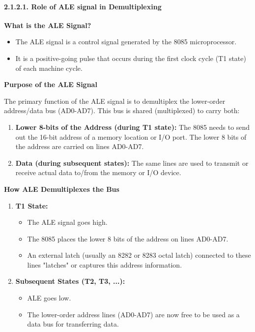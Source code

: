 \documentclass[
]{article}
\begin{document}
\hypertarget{2121-role-of-ale-signal-in-demultiplexing}{%
\paragraph{2.1.2.1. Role of ALE signal in
Demultiplexing}\label{2121-role-of-ale-signal-in-demultiplexing}}

\textbf{What is the ALE Signal?}

\begin{itemize}
\item
  The ALE signal is a control signal generated by the 8085
  microprocessor.
\item
  It is a positive-going pulse that occurs during the first clock cycle
  (T1 state) of each machine cycle.
\end{itemize}

\textbf{Purpose of the ALE Signal}

The primary function of the ALE signal is to demultiplex the lower-order
address/data bus (AD0-AD7). This bus is shared (multiplexed) to carry
both:

\begin{enumerate}
\def\labelenumi{\arabic{enumi}.}
\item
  \textbf{Lower 8-bits of the Address (during T1 state):} The 8085 needs
  to send out the 16-bit address of a memory location or I/O port. The
  lower 8 bits of the address are carried on lines AD0-AD7.
\item
  \textbf{Data (during subsequent states):} The same lines are used to
  transmit or receive actual data to/from the memory or I/O device.
\end{enumerate}

\textbf{How ALE Demultiplexes the Bus}

\begin{enumerate}
\def\labelenumi{\arabic{enumi}.}
\item
  \textbf{T1 State:}

  \begin{itemize}
  \item
    The ALE signal goes high.
  \item
    The 8085 places the lower 8 bits of the address on lines AD0-AD7.
  \item
    An external latch (usually an 8282 or 8283 octal latch) connected to
    these lines "latches" or captures this address information.
  \end{itemize}
\item
  \textbf{Subsequent States (T2, T3, ...):}

  \begin{itemize}
  \item
    ALE goes low.
  \item
    The lower-order address lines (AD0-AD7) are now free to be used as a
    data bus for transferring data.
  \end{itemize}
\end{enumerate}
\end{document}
